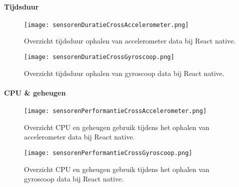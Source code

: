 \paragraph{Tijdsduur}
\begin{figure}[H]
    \centering
    \texttt{[image: sensorenDuratieCrossAccelerometer.png]}
    \caption{Overzicht tijdsduur ophalen van accelerometer data bij React native.}
\end{figure}


\begin{figure}[H]
    \centering
    \texttt{[image: sensorenDuratieCrossGyroscoop.png]}
    \caption{Overzicht tijdsduur ophalen van gyroscoop data bij React native.}
\end{figure}


\paragraph{CPU \& geheugen}
\begin{figure}[H]
    \centering
    \texttt{[image: sensorenPerformantieCrossAccelerometer.png]}
    \caption{Overzicht CPU en geheugen gebruik tijdens het ophalen van accelerometer data bij React native.}
\end{figure}


\begin{figure}[H]
    \centering
    \texttt{[image: sensorenPerformantieCrossGyroscoop.png]}
    \caption{Overzicht CPU en geheugen gebruik tijdens het ophalen van gyroscoop data bij React native.}
\end{figure}
